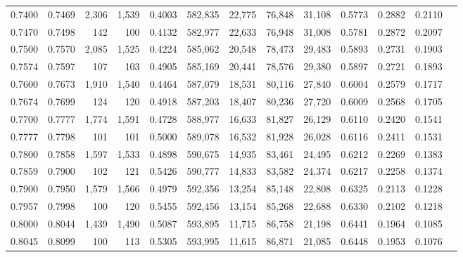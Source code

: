 \begin{tabular}{rrrrrrrrrrrrr}
0.7400 & 0.7469 &  2,306 & 1,539 &                                     0.4003 & 582,835 &  22,775 &  76,848 &  31,108 & 0.5773 & 0.2882 & 0.2110 \\
0.7470 & 0.7498 &    142 &   100 &                                     0.4132 & 582,977 &  22,633 &  76,948 &  31,008 & 0.5781 & 0.2872 & 0.2097 \\
0.7500 & 0.7570 &  2,085 & 1,525 &                                     0.4224 & 585,062 &  20,548 &  78,473 &  29,483 & 0.5893 & 0.2731 & 0.1903 \\
0.7574 & 0.7597 &    107 &   103 &                                     0.4905 & 585,169 &  20,441 &  78,576 &  29,380 & 0.5897 & 0.2721 & 0.1893 \\
0.7600 & 0.7673 &  1,910 & 1,540 &                                     0.4464 & 587,079 &  18,531 &  80,116 &  27,840 & 0.6004 & 0.2579 & 0.1717 \\
0.7674 & 0.7699 &    124 &   120 &                                     0.4918 & 587,203 &  18,407 &  80,236 &  27,720 & 0.6009 & 0.2568 & 0.1705 \\
0.7700 & 0.7777 &  1,774 & 1,591 &                                     0.4728 & 588,977 &  16,633 &  81,827 &  26,129 & 0.6110 & 0.2420 & 0.1541 \\
0.7777 & 0.7798 &    101 &   101 &                                     0.5000 & 589,078 &  16,532 &  81,928 &  26,028 & 0.6116 & 0.2411 & 0.1531 \\
0.7800 & 0.7858 &  1,597 & 1,533 &                                     0.4898 & 590,675 &  14,935 &  83,461 &  24,495 & 0.6212 & 0.2269 & 0.1383 \\
0.7859 & 0.7900 &    102 &   121 &                                     0.5426 & 590,777 &  14,833 &  83,582 &  24,374 & 0.6217 & 0.2258 & 0.1374 \\
0.7900 & 0.7950 &  1,579 & 1,566 &                                     0.4979 & 592,356 &  13,254 &  85,148 &  22,808 & 0.6325 & 0.2113 & 0.1228 \\
0.7957 & 0.7998 &    100 &   120 &                                     0.5455 & 592,456 &  13,154 &  85,268 &  22,688 & 0.6330 & 0.2102 & 0.1218 \\
0.8000 & 0.8044 &  1,439 & 1,490 &                                     0.5087 & 593,895 &  11,715 &  86,758 &  21,198 & 0.6441 & 0.1964 & 0.1085 \\
0.8045 & 0.8099 &    100 &   113 &                                     0.5305 & 593,995 &  11,615 &  86,871 &  21,085 & 0.6448 & 0.1953 & 0.1076 \\

\end{tabular}
